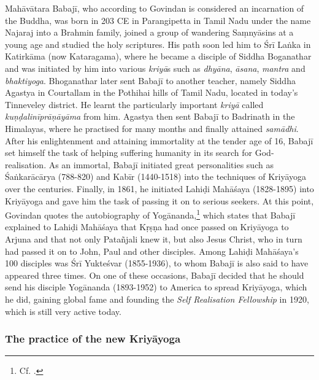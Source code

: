 Mahāvātara Babajī, who according to Govindan is considered an incarnation of the Buddha, was born in 203 CE in Parangipetta in Tamil Nadu under the name Najaraj into a Brahmin family, joined a group of wandering Saṃnyāsins at a young age and studied the holy scriptures. His path soon led him to Śrī Laṅka in Katirkāma (now Kataragama), where he became a disciple of Siddha Boganathar and was initiated by him into various \textit{kriyā}s such as \textit{dhyāna}, \textit{āsana}, \textit{mantra} and \textit{bhaktiyoga}. Bhoganathar later sent Babajī to another teacher, namely Siddha Agastya in Courtallam in the Pothihai hills of Tamil Nadu, located in today's Tinneveley district. He learnt the particularly important \textit{kriyā} called \textit{kuṇḍalinīprāṇāyāma} from him. Agastya then sent Babajī to Badrinath in the Himalayas, where he practised for many months and finally attained \textit{samādhi}. After his enlightenment and attaining immortality at the tender age of 16, Babajī set himself the task of helping suffering humanity in its search for God-realisation. As an immortal, Babajī initiated great personalities such as Śaṅkarācārya (788-820) and Kabīr (1440-1518) into the techniques of Kriyāyoga over the centuries. Finally, in 1861, he initiated Lahiḍi Mahāśaya (1828-1895) into Kriyāyoga and gave him the task of passing it on to serious seekers. At this point, Govindan quotes the autobiography of Yogānanda,\footnote{Cf. \citeauthor[1949: 244]{autobioyogi}.} which states that Babajī explained to Lahiḍi Mahāśaya that Kṛṣṇa had once passed on Kriyāyoga to Arjuna and that not only Patañjali knew it, but also Jesus Christ, who in turn had passed it on to John, Paul and other disciples. Among Lahiḍi Mahāśaya's 100 disciples was Śrī Yukteśvar (1855-1936), to whom Babajī is also said to have appeared three times. On one of these occasions, Babajī decided that he should send his disciple Yogānanda (1893-1952) to America to spread Kriyāyoga, which he did, gaining global fame and founding the \textit{Self Realisation Fellowship} in 1920, which is still very active today.

\subsubsection{The practice of the new Kriyāyoga}

